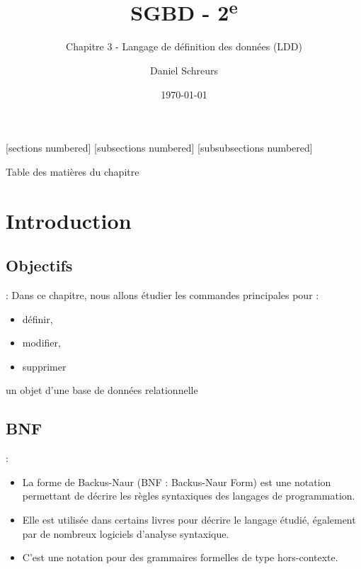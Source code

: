 \documentclass[10pt]{beamer}
\title{SGBD - 2\textsuperscript{e}}
\subtitle{Chapitre 3 - Langage de définition des données (LDD)}
\date{\today}
\author{Daniel Schreurs}
\institute{Haute École de Province de Liège}
\begin{document}
\maketitle

[sections numbered]
[subsections numbered]
[subsubsections numbered]
\begin{frame}[allowframebreaks]{Table des matières du chapitre}
    \tableofcontents[subsectionstyle=show/show/hide,subsubsectionstyle=show/show/hide,]
\end{frame}

\section{Introduction}
\tocss
\subsection{Objectifs}
\begin{frame}{\secname : \subsecname}
    Dans ce chapitre, nous allons étudier les commandes principales pour :

    \begin{itemize}
        \item définir,
        \item modifier,
        \item supprimer
    \end{itemize}
    un objet d’une base de données relationnelle
\end{frame}

\subsection{BNF}
\begin{frame}{\secname : \subsecname}
    \begin{itemize}
        \item La forme de Backus-Naur (BNF : Backus-Naur Form) est une notation permettant de décrire les règles syntaxiques des langages de programmation.
        \item Elle est utilisée dans certains livres pour décrire le langage étudié, également par de nombreux logiciels d'analyse syntaxique.
        \item C'est une notation pour des grammaires formelles de type hors-contexte.
    \end{itemize}
\end{frame}
\end{document}
